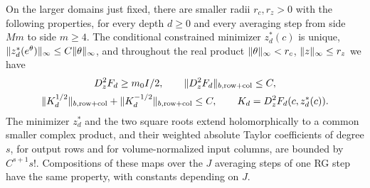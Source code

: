 \begin{lemma}\label{ch11:lem:classical-calculation}
On the larger domains just fixed, there are smaller radii $r_c,r_z>0$ with the following properties, for every depth $d\ge0$ and every averaging step from side $Mm$ to side $m\ge4$. The conditional constrained minimizer $z_d^*(c)$ is unique, $\lVert z_d^*(e^\theta)\rVert_\infty\le C\lVert \theta\rVert_\infty$, and throughout the real product $\lVert \theta\rVert_\infty<r_c$, $\lVert z\rVert_\infty\le r_z$ we have
\[
 \begin{gathered}
 D_z^2F_d\ge m_0I/2,
 \qquad\lVert D_z^2F_d\rVert_{b,\mathrm{row+col}}\le C,\\
 \lVert K_d^{1/2}\rVert_{b,\mathrm{row+col}}+\lVert K_d^{-1/2}\rVert_{b,\mathrm{row+col}}\le C,
 \qquad K_d=D_z^2F_d(c,z_d^*(c)).
 \end{gathered}
\]
The minimizer $z_d^*$ and the two square roots extend holomorphically to a common smaller complex product, and their weighted absolute Taylor coefficients of degree $s$, for output rows and for volume-normalized input columns, are bounded by $C^{s+1}s!$. Compositions of these maps over the $J$ averaging steps of one RG step have the same property, with constants depending on $J$.
\end{lemma}


